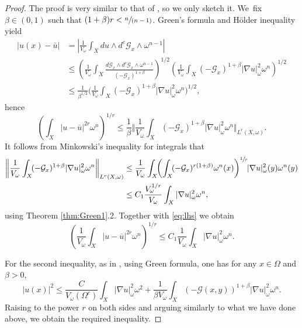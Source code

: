 \documentclass[10pt]{amsart}
\newcommand{\spfrac}[2]{\sfrac{#1}{(#2)}}
\theoremstyle{definition}
\begin{document}
\begin{proof}
The proof is very similar to that of \cite[Th.\,2.1 \& Lem.\,6.2]{GPSS23},
so we only sketch it. We~fix $ \beta\in (0,1)$ such that $(1+\beta)r< \spfrac{n}{n-1}$.
Green's formula and Hölder inequality yield
\begin{align*}
|u(x)-\bar u| &= \left| \frac{1}{V_\omega}\int_X du\wedge d^c {\mathcal{G}_x}\wedge \omega^{n-1} \right|\\
&\leq \left( \frac{1}{V_\omega} \int_X \frac{d \mathcal{G}_x \wedge d^c \mathcal{G}_x\wedge \omega^{n-1}}{(-\mathcal{G}_x)^{1+\beta}} \right)^{1/2} \left( \frac{1}{V_\omega}\int_X ( - \mathcal{G}_x)^{1+\beta} |\nabla u|^2_\omega \omega^n \right)^{1/2}\\
&\leq \frac{1}{\beta^{1/2}} \biggl( \frac{1}{V_\omega}\int_X ( - \mathcal{G}_x)^{1+\beta} |\nabla u|^2_\omega \omega^n \biggr)^{1/2},
\end{align*}
hence
\begin{equation}\label{eq:lhs}
\left( \int_X |u-\overline{u}|^{2r}\omega^n\right)^{1/r}
\leq\frac{1}{\beta} \biggl\Vert \frac{1}{V_\omega}\int_X ( - \mathcal{G}_x)^{1+\beta} |\nabla u|^2_\omega \omega^n \biggr\Vert_{L^r(X, \omega)}.
\end{equation}
It follows from Minkowski's inequality for integrals that
\begin{align*}
\biggl\Vert \frac{1}{V_\omega}\int_X \!( - \mathcal{G}_x)^{1+\beta} |\nabla u|^2_\omega \omega^n \biggr\Vert_{L^r(X, \omega)}
&\leq  \frac{1}{V_\omega} \int_X\!\! \left( \int_X \!( - \mathcal{G}_x)^{r(1+\beta)}\omega^n(x) \right)^{\sfrac{1}{r}}\hspace*{-1mm} |\nabla u|^2_\omega(y) \omega^n(y) \\
&\leq  C_1 \frac{V_{\omega}^{1/r}}{V_{\omega}} \int_X |\nabla u|^2_\omega \omega^n,
\end{align*}
using Theorem \ref{thm:Green1}.2.
Together with \eqref{eq:lhs} we obtain
\[
\left(\frac{1}{V_{\omega}} \int_X |u-\overline{u}|^{2r}\omega^n\right)^{1/r}
\leq C_1\frac{1}{V_{\omega}} \int_X |\nabla u|^2_\omega \omega^n.
\]

For the second inequality, as in \cite[Lem.\,6.2]{GPSS23}, using Green formula, one has for any $x\in \Omega$ and $\beta>0$,
\[
|u(x)|^2\leq \frac{C}{V_\omega(\Omega^c)}\int_X |\nabla u|^2_\omega \omega^2 + \frac{1}{ \beta V_\omega} \int_X (-\mathcal{G}(x,y))^{1+\beta}|\nabla u|^2_\omega \omega^n.
\]
Raising to the power $r$ on both sides and arguing similarly to what we have done above, we obtain the required inequality.
\end{proof}
\end{document}

